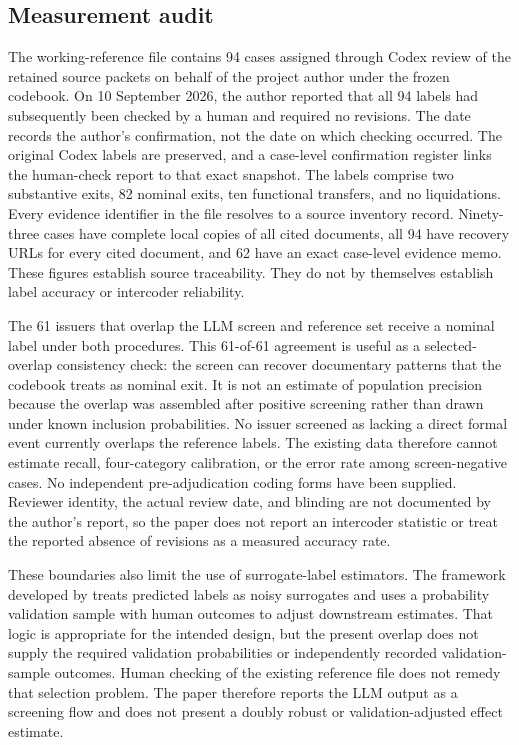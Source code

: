 \subsection{Measurement audit}

The working-reference file contains 94 cases assigned through Codex review of
the retained source packets on behalf of the project author under the frozen
codebook. On 10 September 2026, the author reported that all 94 labels had
subsequently been checked by a human and required no revisions. The date
records the author's confirmation, not the date on which checking occurred.
The original Codex labels are preserved, and a case-level confirmation register
links the human-check report to that exact snapshot. The
labels comprise two substantive exits, 82 nominal exits, ten functional
transfers, and no liquidations. Every
evidence identifier in the file resolves to a source inventory record.
Ninety-three cases have complete local copies of all cited documents, all 94
have recovery URLs for every cited document, and 62 have an exact case-level
evidence memo. These figures establish source traceability. They do not by
themselves establish label accuracy or intercoder reliability.

The 61 issuers that overlap the LLM screen and reference set receive a nominal
label under both procedures. This 61-of-61 agreement is useful as a
selected-overlap consistency check: the screen can recover documentary patterns
that the codebook treats as nominal exit. It is not an estimate of population
precision because the overlap was assembled after positive screening rather
than drawn under known inclusion probabilities. No issuer screened as lacking
a direct formal event currently overlaps the reference labels. The existing
data therefore cannot estimate recall, four-category calibration, or the error
rate among screen-negative cases. No independent pre-adjudication coding
forms have been supplied. Reviewer identity, the actual review date, and
blinding are not documented by the author's report, so the paper does not
report an intercoder statistic or treat the reported absence of revisions as
a measured accuracy rate.

These boundaries also limit the use of surrogate-label estimators. The
framework developed by \citet{egami2023dsl} treats predicted labels as noisy
surrogates and uses a probability validation sample with human outcomes to
adjust downstream estimates. That logic is appropriate for the intended design,
but the present overlap does not supply the required validation probabilities
or independently recorded validation-sample outcomes. Human checking of the
existing reference file does not remedy that selection problem. The paper
therefore reports the LLM output as a
screening flow and does not present a doubly robust or validation-adjusted
effect estimate.

